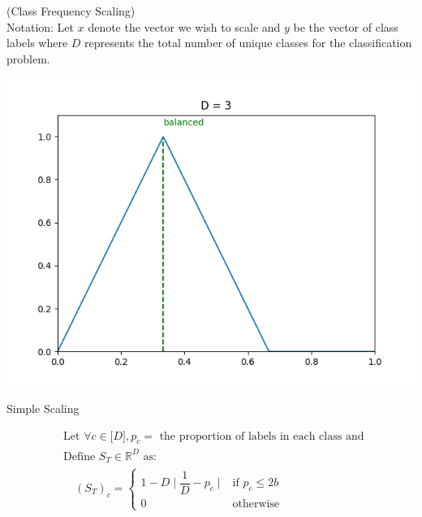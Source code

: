 \documentclass{article} %
\begin{document}
\begin{algorithm}[H]
\caption{ (Class Frequency Scaling) \\ 
Notation: Let $x$ denote the vector we wish to scale and $y$ be the vector of class labels where $D$ represents the total number of unique classes for the classification problem. 
}
\label{alg:smoothing}
\begin{algorithmic}[1]
        \EndFor
    \EndProcedure
\end{algorithmic}
\end{algorithm}

\begin{minipage}{.4\linewidth}
    \centering
    \includegraphics[width=\textwidth]{99_article/99_visuals/extra_plots/scaling.png}
    \caption{Simple Scaling}
    \label{fig:my_label}
\end{minipage}%
\begin{minipage}{.6\textwidth}
    \begin{align}
        & \textrm{Let } \forall c \in \mathopen[ D \mathclose], p_c = \textrm{ the proportion of labels in each class and } \nonumber \\
        & \textrm{Define } S_T \in \mathbb{R}^D \textrm{ as:} \nonumber \\
        & \quad (S_T)_c = \begin{cases}
           1 - D \mid \dfrac{1}{D} - p_c \mid    & \text{if } p_c \leq 2b \\
           0    & \text{otherwise}
      \end{cases}
    \end{align}
\end{minipage}
\end{document}
